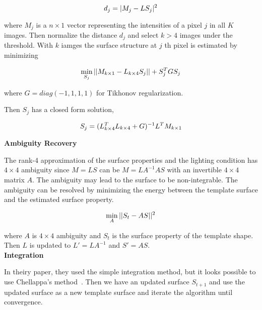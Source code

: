 \documentclass[10pt]{article}
\begin{document}
\begin{equation}
 d_j = |M_j - LS_j|^2 \\
\end{equation}

where $M_j$ is a $n \times 1$ vector representing the intensities of a pixel $j$ in all $K$ images. Then normalize the distance $d_j$ and select $k > 4$ images under the threshold. 
With $k$ iamges the surface structure at $j$ th pixel is estimated by minimizing

\begin{equation}
 \min_{S_j} ||M_{k \times 1} - L_{k \times 4}S_j || + S_j^TGS_j  \\
\end{equation}

where $G = diag( -1, 1, 1, 1 )$ for Tikhonov regularization. 

Then $S_j$ has a closed form solution, 

\begin{equation}
 S_j = (L_{k\times4}^TL_{k \times4} + G)^{-1}L^TM_{k\times1} \\
\end{equation}


\noindent \textbf{Ambiguity Recovery \\}

The rank-4 approximation of the surface properties and the lighting condition has $4\times4$ ambiguity since $M = LS$ can be  $M = LA^{-1}AS$ with an invertible $4 \times 4$ matrix $A$.
The ambiguity may lead to the surface to be non-integrable.
The ambiguity can be resolved by minimizing the energy between the template surface and the estimated surface property. 

\begin{equation}
 \min_{A}{ || S_t - AS ||^2 } \\
\end{equation}

where $A$ is $4 \times 4$ ambiguity and $S_t$ is the surface property of the template shape. 
Then $L$ is updated to $L' = LA^{-1}$ and $S' = AS$. \\

\noindent \textbf{Integration \\}

In theiry paper, they used the simple integration method, but it looks possible to use Chellappa's method~\cite{FramkotC88}.
Then we have an updated surface $S_{t+1}$ and use the updated surface as a new template surface and iterate the algorithm until convergence.
\end{document}
